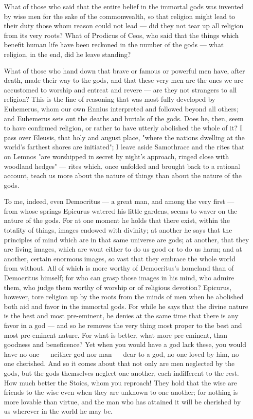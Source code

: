  What of those who said that the entire belief in the immortal gods was invented by wise men for the sake of the commonwealth, so that religion might lead to their duty those whom reason could not lead — did they not tear up all religion from its very roots? What of Prodicus of Ceos, who said that the things which benefit human life have been reckoned in the number of the gods — what religion, in the end, did he leave standing?

 What of those who hand down that brave or famous or powerful men have, after death, made their way to the gods, and that these very men are the ones we are accustomed to worship and entreat and revere — are they not strangers to all religion? This is the line of reasoning that was most fully developed by Euhemerus, whom our own Ennius interpreted and followed beyond all others; and Euhemerus sets out the deaths and burials of the gods. Does he, then, seem to have confirmed religion, or rather to have utterly abolished the whole of it? I pass over Eleusis, that holy and august place, "where the nations dwelling at the world's farthest shores are initiated"; I leave aside Samothrace and the rites that on Lemnos "are worshipped in secret by night's approach, ringed close with woodland hedges" — rites which, once unfolded and brought back to a rational account, teach us more about the nature of things than about the nature of the gods.


 To me, indeed, even Democritus — a great man, and among the very first — from whose springs Epicurus watered his little gardens, seems to waver on the nature of the gods. For at one moment he holds that there exist, within the totality of things, images endowed with divinity; at another he says that the principles of mind which are in that same universe are gods; at another, that they are living images, which are wont either to do us good or to do us harm; and at another, certain enormous images, so vast that they embrace the whole world from without. All of which is more worthy of Democritus's homeland than of Democritus himself; for who can grasp those images in his mind, who admire them, who judge them worthy of worship or of religious devotion? Epicurus, however, tore religion up by the roots from the minds of men when he abolished both aid and favor in the immortal gods. For while he says that the divine nature is the best and most pre-eminent, he denies at the same time that there is any favor in a god — and so he removes the very thing most proper to the best and most pre-eminent nature. For what is better, what more pre-eminent, than goodness and beneficence? Yet when you would have a god lack these, you would have no one — neither god nor man — dear to a god, no one loved by him, no one cherished. And so it comes about that not only are men neglected by the gods, but the gods themselves neglect one another, each indifferent to the rest. How much better the Stoics, whom you reproach! They hold that the wise are friends to the wise even when they are unknown to one another; for nothing is more lovable than virtue, and the man who has attained it will be cherished by us wherever in the world he may be.

